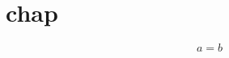 \documentclass{report}
\begin{document}
\chapter{chap}
\begin{equation}
  a=b
\end{equation}
\end{document}
